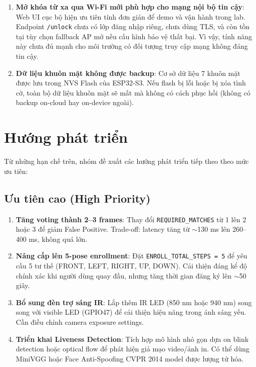 \begin{enumerate}[label=\arabic*.]
  \item \textbf{Mở khóa từ xa qua Wi-Fi mới phù hợp cho mạng nội bộ tin cậy}: Web UI cục bộ hiện ưu tiên tính đơn giản để demo và vận hành trong lab. Endpoint \texttt{/unlock} chưa có lớp đăng nhập riêng, chưa dùng TLS, và còn tồn tại tùy chọn fallback AP mở nếu cấu hình bảo vệ thất bại. Vì vậy, tính năng này chưa đủ mạnh cho môi trường có đối tượng truy cập mạng không đáng tin cậy.
  
  \item \textbf{Dữ liệu khuôn mặt không được backup}: Cơ sở dữ liệu 7 khuôn mặt được lưu trong NVS Flash của ESP32-S3. Nếu flash bị lỗi hoặc bị xóa tình cờ, toàn bộ dữ liệu khuôn mặt sẽ mất mà không có cách phục hồi (không có backup on-cloud hay on-device ngoài).
\end{enumerate}

\section{Hướng phát triển}
\label{sec:future_work}

Từ những hạn chế trên, nhóm đề xuất các hướng phát triển tiếp theo theo mức ưu tiên:

\subsection{Ưu tiên cao (High Priority)}

\begin{enumerate}[label=\arabic*.]
  \item \textbf{Tăng voting thành 2--3 frames}: Thay đổi \texttt{REQUIRED\_MATCHES} từ 1 lên 2 hoặc 3 để giảm False Positive. Trade-off: latency tăng từ $\sim$130 ms lên 260--400 ms, không quá lớn.
  
  \item \textbf{Nâng cấp lên 5-pose enrollment}: Đặt \texttt{ENROLL\_TOTAL\_STEPS = 5} để yêu cầu 5 tư thế (FRONT, LEFT, RIGHT, UP, DOWN). Cải thiện đáng kể độ chính xác khi người dùng quay đầu, nhưng tăng thời gian đăng ký lên $\sim$50 giây.
  
  \item \textbf{Bổ sung đèn trợ sáng IR}: Lắp thêm IR LED (850 nm hoặc 940 nm) song song với visible LED (GPIO47) để cải thiện hiệu năng trong ánh sáng yếu. Cần điều chỉnh camera exposure settings.
  
  \item \textbf{Triển khai Liveness Detection}: Tích hợp mô hình nhỏ gọn dựa on blink detection hoặc optical flow để phát hiện giả mạo video/ảnh in. Có thể dùng MiniVGG hoặc Face Anti-Spoofing CVPR 2014 model được lượng tử hóa.
\end{enumerate}


